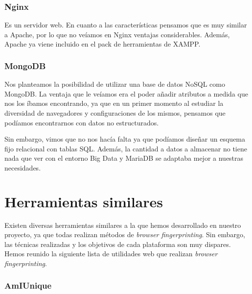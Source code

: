 \subsubsection{Nginx}
Es un servidor web. En cuanto a las características pensamos que es muy similar a Apache, por lo que no veíamos en Nginx ventajas considerables. Además, Apache ya viene incluido en el pack de herramientas de XAMPP. \par 

\subsubsection{MongoDB}
Nos planteamos la posibilidad de utilizar una base de datos NoSQL como MongoDB. La ventaja que le veíamos era el poder añadir atributos a medida que nos los íbamos encontrando, ya que en un primer momento al estudiar la diversidad de navegadores y configuraciones de los mismos, pensamos que podíamos encontrarnos con datos no estructurados. \par 

Sin embargo, vimos que no nos hacía falta ya que podíamos diseñar un esquema fijo relacional con tablas SQL. Además, la cantidad a datos a almacenar no tiene nada que ver con el entorno Big Data y MariaDB se adaptaba mejor a nuestras necesidades. \par 

\section{Herramientas similares}

Existen diversas herramientas similares a la que hemos desarrollado en nuestro proyecto, ya que todas realizan métodos de \textit{browser fingerprinting}. Sin embargo, las técnicas realizadas y los objetivos de cada plataforma son muy dispares. Hemos reunido la siguiente lista de utilidades web que realizan \textit{browser fingerprinting}. \par

\subsubsection{AmIUnique}

